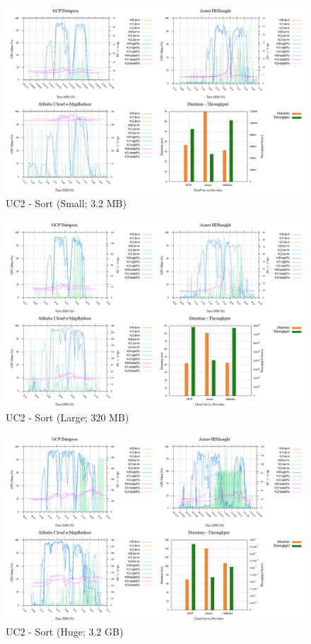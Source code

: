 \documentclass[review]{elsarticle}
\begin{document}
\begin{figure}[b]
	\caption{UC2 - Sort (Small; 3.2 MB)}
	\label{fig:uc2-srt-s-cmidt}
	\includegraphics[width=\textwidth]{uc2-srt-s-cmidt}
	\centering
\end{figure}

\begin{figure}[b]
	\caption{UC2 - Sort (Large; 320 MB)}
	\label{fig:uc2-srt-l-cmidt}
	\includegraphics[width=\textwidth]{uc2-srt-l-cmidt}
	\centering
\end{figure}

\begin{figure}[b]
	\caption{UC2 - Sort (Huge; 3.2 GB)}
	\label{fig:uc2-srt-h-cmidt}
	\includegraphics[width=\textwidth]{uc2-srt-h-cmidt}
	\centering
\end{figure}
\end{document}
